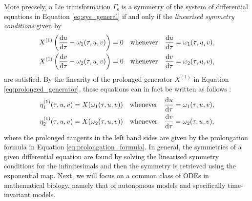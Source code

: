  More precsely, a Lie transformation $\Gamma_\epsilon$ is a symmetry of the system of differential equations in Equation \eqref{eq:sys_general} if and only if the \textit{linearised symmetry conditions} given by
\begin{equation}
  \begin{split}
    X^{(1)}\left(\dv{u}{\tau}-\omega_1(\tau,u,v)\right)&=0\quad\mathrm{whenever}\quad\dv{u}{\tau}=\omega_1(\tau,u,v),\\
    X^{(1)}\left(\dv{v}{\tau}-\omega_2(\tau,u,v)\right)&=0\quad\mathrm{whenever}\quad\dv{v}{\tau}=\omega_2(\tau,u,v),
    \end{split}
  \label{eq:lin_sym_ori}
  \end{equation}
are satisfied. By the linearity of the prolonged generator $X^{(1)}$ in Equation \eqref{eq:prolonged_generator}, these equations can in fact be written as follows \cite{stephani1989differential}:
\begin{equation}
  \begin{split}
    \eta_1^{(1)}(\tau,u,v)&=X(\omega_1(\tau,u,v))\quad\mathrm{whenever}\quad\dv{u}{\tau}=\omega_1(\tau,u,v),\\
    \eta_2^{(1)}(\tau,u,v)&=X(\omega_2(\tau,u,v))\quad\mathrm{whenever}\quad\dv{v}{\tau}=\omega_2(\tau,u,v),
    \end{split}
  \label{eq:lin_sym}
\end{equation}
where the prolonged tangents in the left hand sides are given by the prolongation formula in Equation \eqref{eq:prolongation_formula}. In general, the symmetries of a given differential equation are found by solving the linearised symmetry conditions for the infinitesimals and then the symmetry is retrieved using the exponential map. Next, we will focus on a common class of ODEs in mathematical biology, namely that of autonomous models and specifically time-invariant models. 

